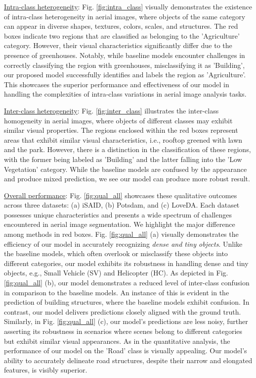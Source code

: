 \documentclass[journal]{IEEEtran}
\begin{document}
\noindent
\underline{Intra-class heterogeneity}: 
Fig. \ref{fig:intra_class} visually demonstrates the existence of intra-class heterogeneity in aerial images, where objects of the same category can appear in diverse shapes, textures, colors, scales, and structures. The red boxes indicate two regions that are classified as belonging to the 'Agriculture' category. However, their visual characteristics significantly differ due to the presence of greenhouses. Notably, while baseline models encounter challenges in correctly classifying the region with greenhouses, misclassifying it as 'Building', our proposed model successfully identifies and labels the region as 'Agriculture'. This showcases the superior performance and effectiveness of our model in handling the complexities of intra-class variations in aerial image analysis tasks.


\noindent
\underline{Inter-class heterogeneity}: 
Fig. \ref{fig:inter_class} illustrates the inter-class homogeneity in aerial images, where objects of different classes may exhibit similar visual properties. The regions enclosed within the red boxes represent areas that exhibit similar visual characteristics, i.e., rooftop greened with lawn and the park. However, there is a distinction in the classification of these regions, with the former being labeled as 'Building' and the latter falling into the 'Low Vegetation' category. 
While the baseline models are confused by the appearance and produce mixed prediction, we see our model can produce more robust result. 

\noindent
\underline{Overall performance}: 
Fig. \ref{fig:qual_all} showcases these qualitative outcomes across three datasets: (a) iSAID, (b) Potsdam, and (c) LoveDA. 
Each dataset possesses unique characteristics and presents a wide spectrum of challenges encountered in aerial image segmentation. We highlight the major difference among methods in red boxes. 
Fig. \ref{fig:qual_all} (a) visually demonstrates the efficiency of our model in accurately recognizing \textit{dense and tiny objects}. Unlike the baseline models, which often overlook or misclassify these objects into different categories, our model exhibits its robustness in handling dense and tiny objects, e.g., Small Vehicle (SV) and Helicopter (HC).
As depicted in Fig. \ref{fig:qual_all} (b), our model demonstrates a reduced level of inter-class confusion in comparison to the baseline models. An instance of this is evident in the prediction of building structures, where the baseline models exhibit confusion. In contrast, our model delivers predictions closely aligned with the ground truth.
Similarly, in Fig. \ref{fig:qual_all} (c), our model's predictions are less noisy, further asserting its robustness in scenarios where scenes belong to different categories but exhibit similar visual appearances. As in the quantitative analysis, the performance of our model on the 'Road' class is visually appealing. Our model's ability to accurately delineate road structures, despite their narrow and elongated features, is visibly superior.
\end{document}
